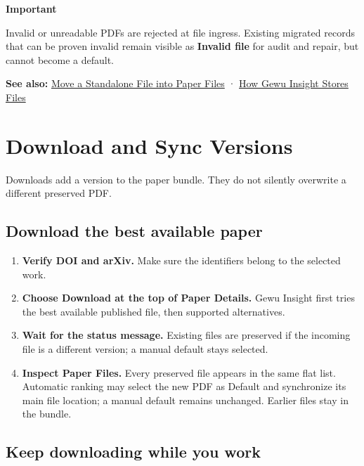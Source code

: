 \documentclass[10pt,letterpaper,oneside]{scrreprt}
\providecommand{\tightlist}{\setlength{\itemsep}{1pt}\setlength{\parskip}{0pt}}
\newenvironment{GewuRelated}{\par\nobreak\vspace{3pt}\nobreak\begingroup\small\sffamily\begin{samepage}\noindent}{\par\end{samepage}\endgroup}
\newenvironment{GewuLead}
  {\begin{list}{}{\leftmargin=0pt\rightmargin=0pt\topsep=0pt\partopsep=0pt\parsep=0pt}\item\relax
    \sffamily\fontsize{10.5}{13.2}\selectfont\color{GewuMuted}}
  {\end{list}}
\renewenvironment{quote}
  {\Needspace{5\baselineskip}\begin{tcolorbox}[enhanced,breakable,colback=GewuPale,colframe=GewuPale,boxrule=0pt,
    borderline west={1.6pt}{0pt}{GewuBlue},arc=1.2mm,left=2.5mm,right=2.5mm,top=1.7mm,bottom=1.7mm,
    before skip=4pt,after skip=5pt,fontupper=\color{GewuInk}\small]}
  {\end{tcolorbox}}
\begin{document}
\begin{quote}
\textbf{Important}

Invalid or unreadable PDFs are rejected at file ingress. Existing migrated records that can be proven invalid remain visible as \textbf{Invalid file} for audit and repair, but cannot become a default.
\end{quote}

\begin{GewuRelated}
\textbf{See also:} \hyperref[drag-attach]{Move a Standalone File into Paper Files} · \hyperref[storage-model]{How Gewu Insight Stores Files}
\end{GewuRelated}

\section{Download and Sync Versions}\label{download-sync}

\begin{GewuLead}
Downloads add a version to the paper bundle. They do not silently overwrite a different preserved PDF.
\end{GewuLead}

\subsection{Download the best available paper}\label{download-the-best-available-paper}

\begin{enumerate}
\tightlist
\item
  \textbf{Verify DOI and arXiv.} Make sure the identifiers belong to the selected work.
\item
  \textbf{Choose \textbf{Download} at the top of Paper Details.} Gewu Insight first tries the best available published file, then supported alternatives.
\item
  \textbf{Wait for the status message.} Existing files are preserved if the incoming file is a different version; a manual default stays selected.
\item
  \textbf{Inspect Paper Files.} Every preserved file appears in the same flat list. Automatic ranking may select the new PDF as Default and synchronize its main file location; a manual default remains unchanged. Earlier files stay in the bundle.
\end{enumerate}

\subsection{Keep downloading while you work}\label{keep-downloading-while-you-work}
\end{document}
